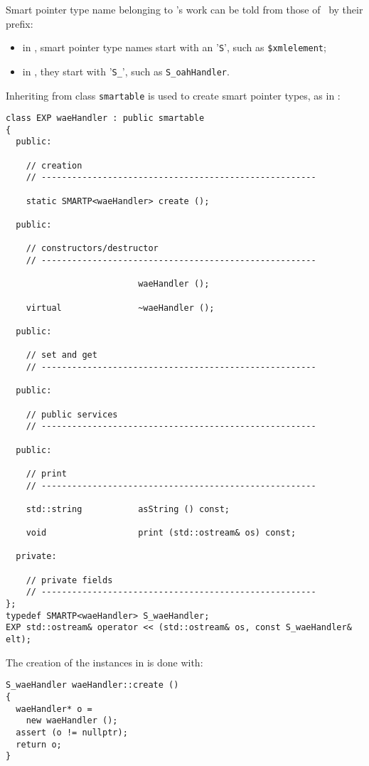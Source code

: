 Smart pointer type name belonging to \fober's work can be told from those of \mf\ by their prefix:
\begin{itemize}
\item  in \libmusicxml, smart pointer type names start with an '{\tt S}', such as {\tt \$xmlelement};
\item in \mf, they start with '{\tt S_}', such as {\tt S_oahHandler}.
\end{itemize}

Inheriting from class   {\tt smartable} is used to create smart pointer types, as in :
\begin{lstlisting}[language=CPlusPlus]
class EXP waeHandler : public smartable
{
  public:

    // creation
    // ------------------------------------------------------

    static SMARTP<waeHandler> create ();

  public:

    // constructors/destructor
    // ------------------------------------------------------

                          waeHandler ();

    virtual               ~waeHandler ();

  public:

    // set and get
    // ------------------------------------------------------

  public:

    // public services
    // ------------------------------------------------------

  public:

    // print
    // ------------------------------------------------------

    std::string           asString () const;

    void                  print (std::ostream& os) const;

  private:

    // private fields
    // ------------------------------------------------------
};
typedef SMARTP<waeHandler> S_waeHandler;
EXP std::ostream& operator << (std::ostream& os, const S_waeHandler& elt);
\end{lstlisting}

The creation of the instances in  is done with:
\begin{lstlisting}[language=CPlusPlus]
S_waeHandler waeHandler::create ()
{
  waeHandler* o =
    new waeHandler ();
  assert (o != nullptr);
  return o;
}
\end{lstlisting}


